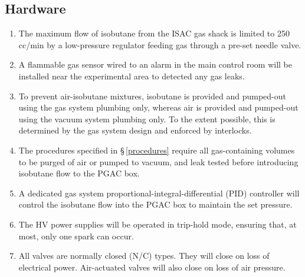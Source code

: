 \subsection{Hardware}
\begin{enumerate}
\setlength{\itemsep}{0pt}
\setlength{\parskip}{0pt}
\setlength{\parsep}{0pt}

\item The maximum flow of isobutane from the ISAC gas shack is limited to 250\,cc/min by a low-pressure regulator feeding gas through a pre-set needle valve.
\item A flammable gas sensor wired to an alarm in the main control room will be installed near the experimental area to detected any gas
leaks.
\item To prevent air-isobutane mixtures, isobutane is provided and pumped-out using the gas system plumbing only, whereas air is provided and pumped-out using the vacuum system plumbing only. To the extent possible, this is determined by the gas system design and enforced by interlocks.
\item The procedures specified in \S\,\ref{procedures} require all gas-containing volumes to be purged of air or pumped to vacuum, and leak tested before introducing isobutane flow to the PGAC box.
\item A dedicated gas system proportional-integral-differential (PID) controller will control the isobutane flow into the PGAC box to maintain the set pressure. 
\item The HV power supplies will be operated in trip-hold mode, ensuring that, at most, only one spark can occur.
\item All valves are normally closed (N/C) types. They will close on loss of electrical power. Air-actuated valves will also close on loss of air pressure.

\end{enumerate}
